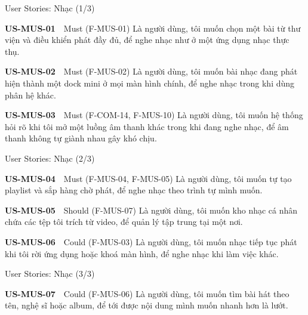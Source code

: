 \begin{frame}{User Stories: Nhạc (1/3)}
\linespread{0.85}
\begin{block}{\scriptsize\bfseries US-MUS-01}~~Must \tiny(F-MUS-01)
{\scriptsize Là người dùng, tôi muốn chọn một bài từ thư viện và điều khiển phát đầy đủ, để nghe nhạc như ở một ứng dụng nhạc thực thụ.}
\end{block}
\vspace{1pt}
\begin{block}{\scriptsize\bfseries US-MUS-02}~~Must \tiny(F-MUS-02)
{\scriptsize Là người dùng, tôi muốn bài nhạc đang phát hiện thành một dock mini ở mọi màn hình chính, để nghe nhạc trong khi dùng phân hệ khác.}
\end{block}
\vspace{1pt}
\begin{block}{\scriptsize\bfseries US-MUS-03}~~Must \tiny(F-COM-14, F-MUS-10)
{\scriptsize Là người dùng, tôi muốn hệ thống hỏi rõ khi tôi mở một luồng âm thanh khác trong khi đang nghe nhạc, để âm thanh không tự giành nhau gây khó chịu.}
\end{block}
\vspace{1pt}
\end{frame}

\begin{frame}{User Stories: Nhạc (2/3)}
\linespread{0.85}
\begin{block}{\scriptsize\bfseries US-MUS-04}~~Must \tiny(F-MUS-04, F-MUS-05)
{\scriptsize Là người dùng, tôi muốn tự tạo playlist và sắp hàng chờ phát, để nghe nhạc theo trình tự mình muốn.}
\end{block}
\vspace{1pt}
\begin{block}{\scriptsize\bfseries US-MUS-05}~~Should \tiny(F-MUS-07)
{\scriptsize Là người dùng, tôi muốn kho nhạc cá nhân chứa các tệp tôi trích từ video, để quản lý tập trung tại một nơi.}
\end{block}
\vspace{1pt}
\begin{block}{\scriptsize\bfseries US-MUS-06}~~Could \tiny(F-MUS-03)
{\scriptsize Là người dùng, tôi muốn nhạc tiếp tục phát khi tôi rời ứng dụng hoặc khoá màn hình, để nghe nhạc khi làm việc khác.}
\end{block}
\vspace{1pt}
\end{frame}

\begin{frame}{User Stories: Nhạc (3/3)}
\linespread{0.85}
\begin{block}{\scriptsize\bfseries US-MUS-07}~~Could \tiny(F-MUS-06)
{\scriptsize Là người dùng, tôi muốn tìm bài hát theo tên, nghệ sĩ hoặc album, để tới được nội dung mình muốn nhanh hơn là lướt.}
\end{block}
\vspace{1pt}
\end{frame}

